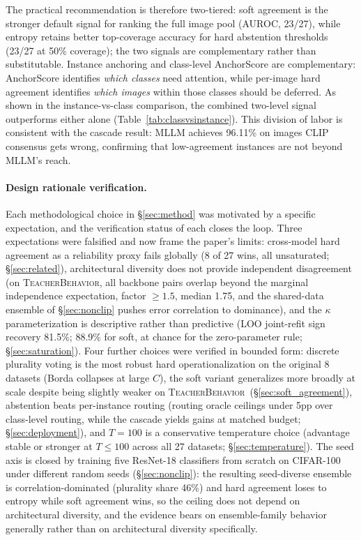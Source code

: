 \documentclass[a4paper,fleqn]{cas-sc}
\newcommand{\tb}{\textsc{TeacherBehavior}}
\begin{document}
The practical recommendation is therefore two-tiered: soft agreement is the stronger default signal for ranking the full image pool (AUROC, 23/27), while entropy retains better top-coverage accuracy for hard abstention thresholds (23/27 at 50\% coverage); the two signals are complementary rather than substitutable.
Instance anchoring and class-level AnchorScore \citep{visualanchor} are complementary: AnchorScore identifies \emph{which classes} need attention, while per-image hard agreement identifies \emph{which images} within those classes should be deferred.
As shown in the instance-vs-class comparison, the combined two-level signal outperforms either alone (Table~\ref{tab:classvsinstance}).
This division of labor is consistent with the cascade result: MLLM achieves 96.11\% on images CLIP consensus gets wrong, confirming that low-agreement instances are not beyond MLLM's reach.

\paragraph{Design rationale verification.}
Each methodological choice in \S\ref{sec:method} was motivated by a specific expectation, and the verification status of each closes the loop.
Three expectations were falsified and now frame the paper's limits: cross-model hard agreement as a reliability proxy fails globally (8 of 27 wins, all unsaturated; \S\ref{sec:related}), architectural diversity does not provide independent disagreement (on \tb{}, all backbone pairs overlap beyond the marginal independence expectation, factor $\ge 1.5$, median 1.75, and the shared-data ensemble of \S\ref{sec:nonclip} pushes error correlation to dominance), and the $\kappa$ parameterization is descriptive rather than predictive (LOO joint-refit sign recovery 81.5\%; 88.9\% for soft, at chance for the zero-parameter rule; \S\ref{sec:saturation}).
Four further choices were verified in bounded form: discrete plurality voting is the most robust hard operationalization on the original 8 datasets (Borda collapses at large $C$), the soft variant generalizes more broadly at scale despite being slightly weaker on \tb\ (\S\ref{sec:soft_agreement}), abstention beats per-instance routing (routing oracle ceilings under 5pp over class-level routing, while the cascade yields gains at matched budget; \S\ref{sec:deployment}), and $T{=}100$ is a conservative temperature choice (advantage stable or stronger at $T \le 100$ across all 27 datasets; \S\ref{sec:temperature}).
The seed axis is closed by training five ResNet-18 classifiers from scratch on CIFAR-100 under different random seeds (\S\ref{sec:nonclip}): the resulting seed-diverse ensemble is correlation-dominated (plurality share 46\%) and hard agreement loses to entropy while soft agreement wins, so the ceiling does not depend on architectural diversity, and the evidence bears on ensemble-family behavior generally rather than on architectural diversity specifically.
\end{document}
